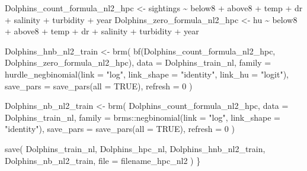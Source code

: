 \documentclass[
  english,
  letterpaper,
  DIV=11,
  numbers=noendperiod]{scrartcl}
\newenvironment{Shaded}{\begin{snugshade}}{\end{snugshade}}
\newcommand{\AttributeTok}[1]{\textcolor[rgb]{0.40,0.45,0.13}{#1}}
\newcommand{\ConstantTok}[1]{\textcolor[rgb]{0.56,0.35,0.01}{#1}}
\newcommand{\DecValTok}[1]{\textcolor[rgb]{0.68,0.00,0.00}{#1}}
\newcommand{\FunctionTok}[1]{\textcolor[rgb]{0.28,0.35,0.67}{#1}}
\newcommand{\NormalTok}[1]{\textcolor[rgb]{0.00,0.23,0.31}{#1}}
\newcommand{\OtherTok}[1]{\textcolor[rgb]{0.00,0.23,0.31}{#1}}
\newcommand{\SpecialCharTok}[1]{\textcolor[rgb]{0.37,0.37,0.37}{#1}}
\newcommand{\StringTok}[1]{\textcolor[rgb]{0.13,0.47,0.30}{#1}}
\begin{document}
\begin{Shaded}
\begin{Highlighting}[]
\NormalTok{  Dolphins\_count\_formula\_nl2\_hpc }\OtherTok{\textless{}{-}}\NormalTok{ sightings }\SpecialCharTok{\textasciitilde{}}\NormalTok{ below8 }\SpecialCharTok{+}\NormalTok{ above8 }\SpecialCharTok{+}\NormalTok{ temp }\SpecialCharTok{+}\NormalTok{ dr }\SpecialCharTok{+}\NormalTok{ salinity }\SpecialCharTok{+}\NormalTok{ turbidity }\SpecialCharTok{+}\NormalTok{ year}
\NormalTok{  Dolphins\_zero\_formula\_nl2\_hpc  }\OtherTok{\textless{}{-}}\NormalTok{ hu }\SpecialCharTok{\textasciitilde{}}\NormalTok{ below8 }\SpecialCharTok{+}\NormalTok{ above8 }\SpecialCharTok{+}\NormalTok{ temp }\SpecialCharTok{+}\NormalTok{ dr }\SpecialCharTok{+}\NormalTok{ salinity }\SpecialCharTok{+}\NormalTok{ turbidity }\SpecialCharTok{+}\NormalTok{ year}

\NormalTok{  Dolphins\_hnb\_nl2\_train }\OtherTok{\textless{}{-}} \FunctionTok{brm}\NormalTok{(}
    \FunctionTok{bf}\NormalTok{(Dolphins\_count\_formula\_nl2\_hpc, Dolphins\_zero\_formula\_nl2\_hpc),}
    \AttributeTok{data   =}\NormalTok{ Dolphins\_train\_nl,}
    \AttributeTok{family =} \FunctionTok{hurdle\_negbinomial}\NormalTok{(}\AttributeTok{link =} \StringTok{"log"}\NormalTok{, }\AttributeTok{link\_shape =} \StringTok{"identity"}\NormalTok{, }\AttributeTok{link\_hu =} \StringTok{"logit"}\NormalTok{),}
    \AttributeTok{save\_pars =} \FunctionTok{save\_pars}\NormalTok{(}\AttributeTok{all =} \ConstantTok{TRUE}\NormalTok{),}
    \AttributeTok{refresh   =} \DecValTok{0}
\NormalTok{  )}

\NormalTok{  Dolphins\_nb\_nl2\_train }\OtherTok{\textless{}{-}} \FunctionTok{brm}\NormalTok{(}
\NormalTok{    Dolphins\_count\_formula\_nl2\_hpc,}
    \AttributeTok{data   =}\NormalTok{ Dolphins\_train\_nl,}
    \AttributeTok{family =}\NormalTok{ brms}\SpecialCharTok{::}\FunctionTok{negbinomial}\NormalTok{(}\AttributeTok{link =} \StringTok{"log"}\NormalTok{, }\AttributeTok{link\_shape =} \StringTok{"identity"}\NormalTok{),}
    \AttributeTok{save\_pars =} \FunctionTok{save\_pars}\NormalTok{(}\AttributeTok{all =} \ConstantTok{TRUE}\NormalTok{),}
    \AttributeTok{refresh   =} \DecValTok{0}
\NormalTok{  )}

  \FunctionTok{save}\NormalTok{(}
\NormalTok{    Dolphins\_train\_nl, Dolphins\_hpc\_nl,}
\NormalTok{    Dolphins\_hnb\_nl2\_train, Dolphins\_nb\_nl2\_train,}
    \AttributeTok{file =}\NormalTok{ filename\_hpc\_nl2}
\NormalTok{  )}
\NormalTok{\}}


\end{Highlighting}
\end{Shaded}
\end{document}
